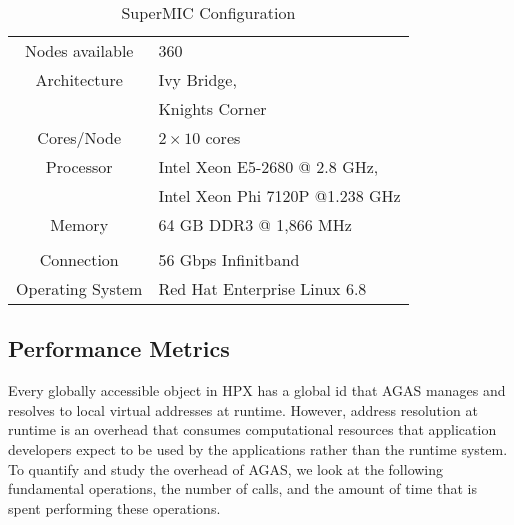 
\begin{table*}
  \centering
  \caption{SuperMIC Configuration}
  \label{tab:machines}
    \begin{tabular}{cl}  
    \toprule
    Nodes available  & 360                             \\
    Architecture     & Ivy Bridge,                     \\
                     & Knights Corner                  \\
    Cores/Node       & $2 \times 10$ cores             \\
    Processor        & Intel Xeon E5-2680 @ 2.8 GHz,   \\
                     & Intel Xeon Phi 7120P @1.238 GHz \\
    Memory           & 64 GB DDR3 @ 1,866 MHz          \\
                     &                                 \\
    Connection       & 56 Gbps Infinitband             \\
    Operating System & Red Hat Enterprise Linux 6.8    \\
    \bottomrule
    \end{tabular}
\end{table*}

\subsection{Performance Metrics}
Every globally accessible object in HPX has a global id that AGAS manages and
resolves to local virtual addresses at runtime. However, address resolution at runtime is
an overhead that consumes computational resources that application developers expect to be used by the
applications rather than the runtime system. To quantify and study the overhead of AGAS, we look at the following
fundamental operations, the number of calls, and the amount of time that is
spent performing these operations.

